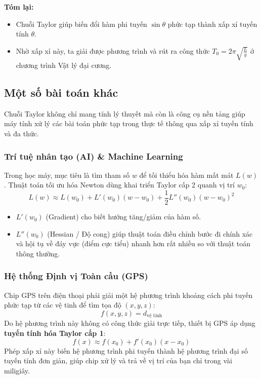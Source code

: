 \documentclass[12pt]{article}
\theoremstyle{definition}
\theoremstyle{remark}
\begin{document}
\begin{note}
\textbf{Tóm lại:} 
\begin{itemize}
    \item Chuỗi Taylor giúp biến đổi hàm phi tuyến $\sin \theta$ phức tạp thành xấp xỉ tuyến tính $\theta$.
    \item Nhờ xấp xỉ này, ta giải được phương trình và rút ra công thức $T_0 = 2\pi \sqrt{\frac{L}{g}}$ ở chương trình Vật lý đại cương.
\end{itemize}
\subsection{Một số bài toán khác}
Chuỗi Taylor không chỉ mang tính lý thuyết mà còn là công cụ nền tảng giúp máy tính xử lý các bài toán phức tạp trong thực tế thông qua xấp xỉ tuyến tính và đa thức.
\subsubsection{Trí tuệ nhân tạo (AI) \& Machine Learning}
Trong học máy, mục tiêu là tìm tham số $w$ để tối thiểu hóa hàm mất mát $L(w)$. Thuật toán tối ưu hóa Newton dùng khai triển Taylor cấp 2 quanh vị trí $w_0$:
\begin{equation}
    L(w) \approx L(w_0) + L'(w_0)(w - w_0) + \frac{1}{2} L''(w_0)(w - w_0)^2
\end{equation}
\begin{itemize}
    \item $L'(w_0)$ (Gradient) cho biết hướng tăng/giảm của hàm số.
    \item $L''(w_0)$ (Hessian / Độ cong) giúp thuật toán điều chỉnh bước đi chính xác và hội tụ về đáy vực (điểm cực tiểu) nhanh hơn rất nhiều so với thuật toán thông thường.
\end{itemize}

\subsubsection{Hệ thống Định vị Toàn cầu (GPS)}
Chip GPS trên điện thoại phải giải một hệ phương trình khoảng cách phi tuyến phức tạp từ các vệ tinh để tìm tọa độ $(x, y, z)$:
\begin{equation}
    f(x, y, z) = d_{\text{vệ tinh}}
\end{equation}
Do hệ phương trình này không có công thức giải trực tiếp, thiết bị GPS áp dụng \textbf{tuyến tính hóa Taylor cấp 1}:
\[
f(x) \approx f(x_0) + f'(x_0)(x - x_0)
\]
Phép xấp xỉ này biến hệ phương trình phi tuyến thành hệ phương trình đại số tuyến tính đơn giản, giúp chip xử lý và trả về vị trí của bạn chỉ trong vài miligiây.


\end{note}
\end{document}
